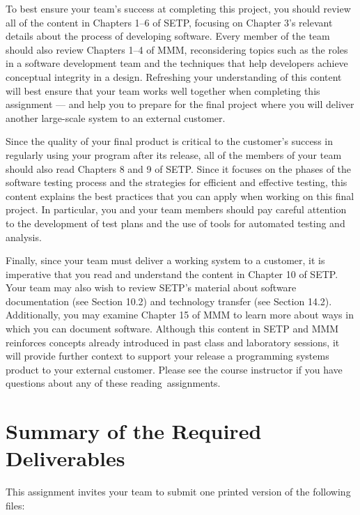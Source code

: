 To best ensure your team's success at completing this project, you should review all of the content in Chapters 1--6 of
SETP, focusing on Chapter 3's relevant details about the process of developing software. Every member of the team should
also review Chapters 1--4 of MMM, reconsidering topics such as the roles in a software development team and the
techniques that help developers achieve conceptual integrity in a design. Refreshing your understanding of this content
will best ensure that your team works well together when completing this assignment --- and help you to prepare for the
final project where you will deliver another large-scale system to an external customer.

Since the quality of your final product is critical to the customer's success in regularly using your program after its
release, all of the members of your team should also read Chapters 8 and 9 of SETP. Since it focuses on the phases of
the software testing process and the strategies for efficient and effective testing, this content explains the best
practices that you can apply when working on this final project. In particular, you and your team members should pay
careful attention to the development of test plans and the use of tools for automated testing and analysis.

 Finally, since your team must deliver a working system to a customer, it is imperative that you read and understand the
 content in Chapter 10 of SETP. Your team may also wish to review SETP's material about software documentation (see
 Section 10.2) and technology transfer (see Section 14.2).  Additionally, you may examine Chapter 15 of MMM to learn
 more about ways in which you can document software. Although this content in SETP and MMM reinforces concepts already
 introduced in past class and laboratory sessions, it will provide further context to support your release a programming
 systems product to your external customer.  Please see the course instructor if you have questions about any of these
 \mbox{reading assignments}.

\section*{Summary of the Required Deliverables}

This assignment invites your team to submit one printed version of the following files:

